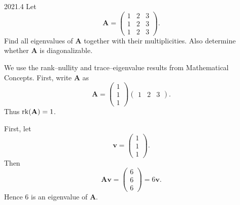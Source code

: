     \begin{pastproblem}{2021.4}
        Let
        \[
            \mathbf{A}
            =
            \begin{pmatrix}
                1 & 2 & 3 \\
                1 & 2 & 3 \\
                1 & 2 & 3
            \end{pmatrix}.
        \]
        Find all eigenvalues of $\mathbf{A}$ together with their multiplicities. Also determine
        whether $\mathbf{A}$ is diagonalizable.
    \end{pastproblem}

    \begin{solution}
        We use the rank--nullity and trace--eigenvalue results from Mathematical
        Concepts. First, write $\mathbf{A}$ as
        \[
            \mathbf{A}
            =
            \begin{pmatrix}
                1 \\
                1 \\
                1
            \end{pmatrix}
            \begin{pmatrix}
                1 & 2 & 3
            \end{pmatrix}.
        \]
        Thus $\operatorname{rk}(\mathbf{A})=1$.

        First, let
        \[
            \mathbf{v}
            =
            \begin{pmatrix}
                1 \\
                1 \\
                1
            \end{pmatrix}.
        \]
        Then
        \[
            \mathbf{A}\mathbf{v}
            =
            \begin{pmatrix}
                6 \\
                6 \\
                6
            \end{pmatrix}
            =
            6\mathbf{v}.
        \]
        Hence $6$ is an eigenvalue of $\mathbf{A}$.


\end{solution}
